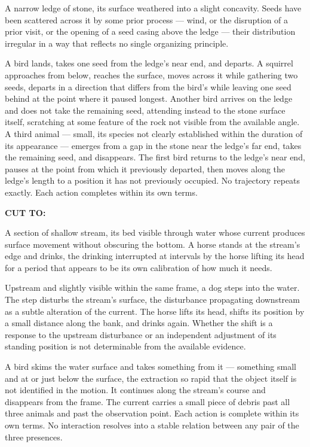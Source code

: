 \documentclass[12pt, oneside]{article}
\newcommand{\sceneheading}[1]{%
  \vspace{1.8em}%
  \noindent{\bfseries\large\MakeUppercase{#1}}%
  \vspace{0.6em}%
  \par\noindent{\color{rulecolor}\rule{\linewidth}{0.3pt}}%
  \vspace{0.5em}\par%
}
\newenvironment{action}{%
  \vspace{0.6em}%
  \noindent\ignorespaces%
}{%
  \par\vspace{0.6em}%
}
\newcommand{\scenenumber}[1]{%
  \vspace{1em}%
  \noindent{\small\bfseries\scshape Scene #1}%
  \vspace{0.3em}\par%
}
\newcommand{\transition}[1]{%
  \vspace{0.8em}%
  \begin{flushright}%
    \bfseries #1%
  \end{flushright}%
  \vspace{0.5em}%
}
\begin{document}
\begin{action}
A narrow ledge of stone, its surface weathered into a slight concavity. Seeds have been scattered across it by some prior process --- wind, or the disruption of a prior visit, or the opening of a seed casing above the ledge --- their distribution irregular in a way that reflects no single organizing principle.

A bird lands, takes one seed from the ledge's near end, and departs. A squirrel approaches from below, reaches the surface, moves across it while gathering two seeds, departs in a direction that differs from the bird's while leaving one seed behind at the point where it paused longest. Another bird arrives on the ledge and does not take the remaining seed, attending instead to the stone surface itself, scratching at some feature of the rock not visible from the available angle. A third animal --- small, its species not clearly established within the duration of its appearance --- emerges from a gap in the stone near the ledge's far end, takes the remaining seed, and disappears. The first bird returns to the ledge's near end, pauses at the point from which it previously departed, then moves along the ledge's length to a position it has not previously occupied. No trajectory repeats exactly. Each action completes within its own terms.
\end{action}

\transition{CUT TO:}

\scenenumber{16g — The Water Edge}

\sceneheading{EXT. Shallow Stream — Evening}

\begin{action}
A section of shallow stream, its bed visible through water whose current produces surface movement without obscuring the bottom. A horse stands at the stream's edge and drinks, the drinking interrupted at intervals by the horse lifting its head for a period that appears to be its own calibration of how much it needs.

Upstream and slightly visible within the same frame, a dog steps into the water. The step disturbs the stream's surface, the disturbance propagating downstream as a subtle alteration of the current. The horse lifts its head, shifts its position by a small distance along the bank, and drinks again. Whether the shift is a response to the upstream disturbance or an independent adjustment of its standing position is not determinable from the available evidence.

A bird skims the water surface and takes something from it --- something small and at or just below the surface, the extraction so rapid that the object itself is not identified in the motion. It continues along the stream's course and disappears from the frame. The current carries a small piece of debris past all three animals and past the observation point. Each action is complete within its own terms. No interaction resolves into a stable relation between any pair of the three presences.
\end{action}
\end{document}
